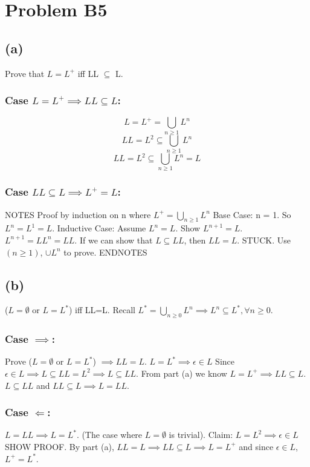 \documentclass[12pt]{article}
\begin{document}
\section*{Problem B5}
\subsection*{(a)} Prove that $L=L^+$ iff LL $\subseteq$ L.
\subsubsection*{Case $L=L^+ \implies LL \subseteq L$:}
$$L = L^+ = \bigcup\limits_{n\ge1} L^n$$
$$LL = L^2 \subseteq \bigcup\limits_{n\ge1} L^n$$
$$LL = L^2 \subseteq \bigcup\limits_{n\ge1} L^n = L$$

\subsubsection*{Case $LL \subseteq L \implies L^+ = L$:}
NOTES
\newline
Proof by induction on n where $L^+ = \bigcup\limits_{n\ge1} L^n$
Base Case: n = 1. So $L^n = L^1  = L$.
Inductive Case: Assume $L^n = L$.
Show $L^{n+1} =L$. 
\newline 
$L^{n+1} = LL^{n} = LL$. If we can show that $L \subseteq LL$, then 
$LL=L$.
STUCK. Use $(n \ge 1)$, $ \cup L^n$ to prove.
ENDNOTES

\subsection*{(b)}
($L=\emptyset$ or $L=L^*$) iff LL=L.
Recall $L^\ast = \bigcup\limits_{n \ge 0} L^n \implies L^n \subseteq L^\ast,
\forall n\ge 0$.
\newline
\subsubsection*{Case $\implies$:}
Prove ($L=\emptyset$ or $L=L^*$)
$\implies LL=L$. $L = L^\ast \implies {\epsilon } \in L$
Since ${\epsilon } \in L \implies L \subseteq LL = L^2 \implies L \subseteq LL$.
From part (a) we know $L=L^+ \implies LL \subseteq L$. 
$L \subseteq LL$ and $LL \subseteq L \implies L = LL$.

\subsubsection*{Case $\Longleftarrow$:} 
$L=LL \implies L = L^\ast$.
(The case where $L= \emptyset$ is trivial).
Claim: $L=L^2 \implies {\epsilon } \in L$ SHOW PROOF.
By part (a), $LL=L \implies LL \subseteq L \implies
L = L^+$ and since ${\epsilon } \in L$, $L^+=L^\ast$.
\end{document}
